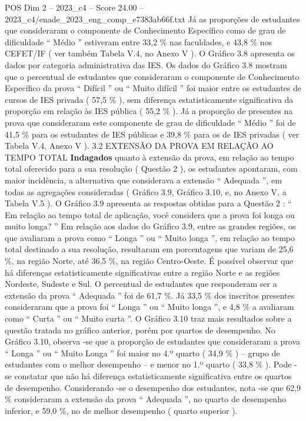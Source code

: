 \begin{textsample}{POS Dim 2 – 2023\_c4 – Score 24.00 – 2023\_c4/enade\_2023\_eng\_comp\_e7383ab66f.txt}
Já as proporções de estudantes que consideraram o componente de Conhecimento Específico como de grau de dificuldade “ Médio ” estiveram entre 33,2 \% nas faculdades, e 43,8 \% nos CEFET/IF ( ver também Tabela V.4, no Anexo V ).
O Gráfico 3.8 apresenta os dados por categoria administrativa das IES.
Os dados do Gráfico 3.8 mostram que o percentual de estudantes que consideraram o componente de Conhecimento Específico da prova “ Difícil ” ou “ Muito difícil ” foi maior entre os estudantes de cursos de IES privada ( 57,5 \% ), sem diferença estatisticamente significativa da proporção em relação às IES pública ( 55,2 \% ).
Já a proporção de presentes na prova que consideraram este componente de grau de dificuldade “ Médio ” foi de 41,5 \% para os estudantes de IES públicas e 39,8 \% para os de IES privadas ( ver Tabela V.4, Anexo V ). 3.2 EXTENSÃO DA PROVA EM RELAÇÃO AO TEMPO TOTAL \textbf{Indagados} quanto à extensão da prova, em relação ao tempo total oferecido para a sua resolução ( Questão 2 ), os estudantes apontaram, com maior incidência, a alternativa que considerava a extensão “ Adequada ”, em todas as agregações consideradas ( Gráfico 3.9, Gráfico 3.10, e, no Anexo V, a Tabela V.5 ).
O Gráfico 3.9 apresenta as respostas obtidas para a Questão 2 : “ Em relação ao tempo total de aplicação, você considera que a prova foi longa ou muito longa? ” Em relação aos dados do Gráfico 3.9, entre as grandes regiões, os que avaliaram a prova como “ Longa ” ou “ Muito longa ”, em relação ao tempo total destinado a sua resolução, resultaram em porcentagens que variam de 25,6 \%, na região Norte, até 36,5 \%, na região Centro-Oeste.
É possível observar que há diferenças estatisticamente significativas entre a região Norte e as regiões Nordeste, Sudeste e Sul.
O percentual de estudantes que responderam ser a extensão da prova “ Adequada ” foi de 61,7 \%.
Já 33,5 \% dos inscritos presentes consideraram que a prova foi “ Longa ” ou “ Muito longa ”, e 4,8 \% a avaliaram como “ Curta ” ou “ Muito curta ”.
O Gráfico 3.10 traz mais resultados sobre a questão tratada no gráfico anterior, porém por quartos de desempenho.
No Gráfico 3.10, observa -se que a proporção de estudantes que consideraram a prova “ Longa ” ou “ Muito Longa ” foi maior no 4.º quarto ( 34,9 \% ) – grupo de estudantes com o melhor desempenho – e menor no 1.º quarto ( 33,8 \% ).
Pode -se constatar que não há diferença estatisticamente significativa entre os quartos de desempenho.
Considerando -se o desempenho dos estudantes, nota -se que 62,9 \% consideraram a extensão da prova “ Adequada ”, no quarto de desempenho inferior, e 59,0 \%, no de melhor desempenho ( quarto superior ).

\end{textsample}
